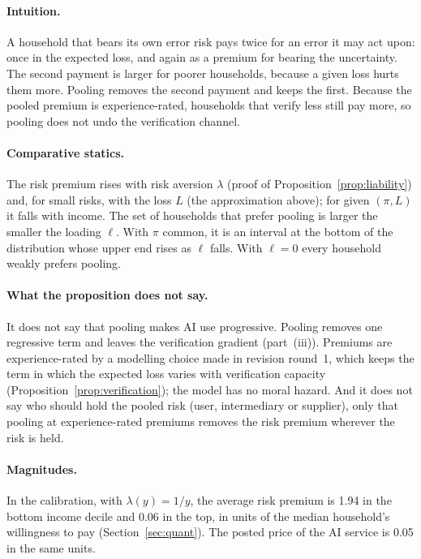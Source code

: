 \documentclass[12pt]{article}
\theoremstyle{remark}
\begin{document}
\paragraph{Intuition.} A household that bears its own error risk pays twice for an error it may act upon: once in the expected loss, and again as a premium for bearing the uncertainty. The second payment is larger for poorer households, because a given loss hurts them more. Pooling removes the second payment and keeps the first. Because the pooled premium is experience-rated, households that verify less still pay more, so pooling does not undo the verification channel.

\paragraph{Comparative statics.} The risk premium rises with risk aversion $\lambda$ (proof of Proposition~\ref{prop:liability}) and, for small risks, with the loss $L$ (the approximation above); for given $(\pi,L)$ it falls with income. The set of households that prefer pooling is larger the smaller the loading $\ell$. With $\pi$ common, it is an interval at the bottom of the distribution whose upper end rises as $\ell$ falls. With $\ell=0$ every household weakly prefers pooling.

\paragraph{What the proposition does not say.} It does not say that pooling makes AI use progressive. Pooling removes one regressive term and leaves the verification gradient (part~(iii)). Premiums are experience-rated by a modelling choice made in revision round~1, which keeps the term in which the expected loss varies with verification capacity (Proposition~\ref{prop:verification}); the model has no moral hazard. And it does not say who should hold the pooled risk (user, intermediary or supplier), only that pooling at experience-rated premiums removes the risk premium wherever the risk is held.

\paragraph{Magnitudes.} In the calibration, with $\lambda(y)=1/y$, the average risk premium is 1.94 in the bottom income decile and 0.06 in the top, in units of the median household's willingness to pay (Section~\ref{sec:quant}). The posted price of the AI service is 0.05 in the same units.
\end{document}
